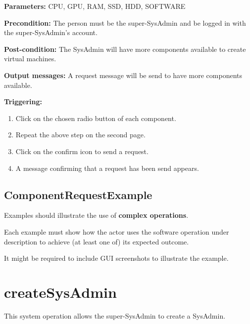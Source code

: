 \begin{description}

\item \textbf{Parameters:} CPU, GPU, RAM, SSD, HDD, SOFTWARE
\item \textbf{Precondition:} The person must be the super-SysAdmin and be logged
in with the super-SysAdmin's account.
\item \textbf{Post-condition:} The SysAdmin will have more components
available to create virtual machines.
\item \textbf{Output messages:} A request message will be send to have more
components available.

\item \textbf{Triggering:}
\begin{enumerate}
\item Click on the chosen radio button of each component.
\item Repeat the above step on the second page.
\item Click on the confirm icon to send a request.
\item A message confirming that a request has been send appears.
\end{enumerate}

 
\end{description}

\subsection{ComponentRequestExample}
Examples should illustrate the use of \textbf{complex operations}.

Each example must show how the actor uses the software operation under
description to achieve (at least one of) its expected outcome.

It might be required to include GUI screenshots to illustrate the example.




\section{createSysAdmin}
\label{operation:createSysAdmin}
This system operation allows the super-SysAdmin to create a SysAdmin.

